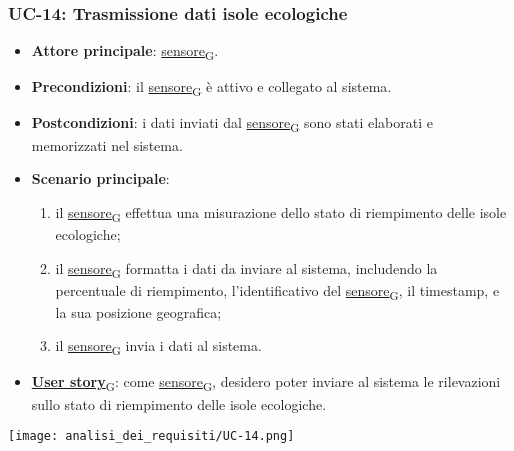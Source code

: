 \newpage
\subsubsection{UC-14: Trasmissione dati isole ecologiche}
\begin{itemize}
	\item \textbf{Attore principale}: \href{https://7last.github.io/docs/pb/documentazione-interna/glossario\#sensore}{sensore\textsubscript{G}}.
	\item \textbf{Precondizioni}: il \href{https://7last.github.io/docs/pb/documentazione-interna/glossario\#sensore}{sensore\textsubscript{G}} è attivo e collegato al sistema.
	\item \textbf{Postcondizioni}: i dati inviati dal \href{https://7last.github.io/docs/pb/documentazione-interna/glossario\#sensore}{sensore\textsubscript{G}} sono stati elaborati e memorizzati nel sistema.
	\item \textbf{Scenario principale}:
	      \begin{enumerate}
		      \item il \href{https://7last.github.io/docs/pb/documentazione-interna/glossario\#sensore}{sensore\textsubscript{G}} effettua una misurazione dello stato di riempimento delle isole ecologiche;
		      \item il \href{https://7last.github.io/docs/pb/documentazione-interna/glossario\#sensore}{sensore\textsubscript{G}} formatta i dati da inviare al sistema, includendo la percentuale di riempimento, l'identificativo del \href{https://7last.github.io/docs/pb/documentazione-interna/glossario\#sensore}{sensore\textsubscript{G}},
		            il timestamp, e la sua posizione geografica;
		      \item il \href{https://7last.github.io/docs/pb/documentazione-interna/glossario\#sensore}{sensore\textsubscript{G}} invia i dati al sistema.
	      \end{enumerate}
	\item \href{https://7last.github.io/docs/pb/documentazione-interna/glossario\#user-story}{\textbf{User story}\textsubscript{G}}: come \href{https://7last.github.io/docs/pb/documentazione-interna/glossario\#sensore}{sensore\textsubscript{G}}, desidero poter inviare al sistema le rilevazioni sullo stato di riempimento delle isole ecologiche.
\end{itemize}
\begin{center}
	\texttt{[image: analisi\_dei\_requisiti/UC-14.png]}
\end{center}

